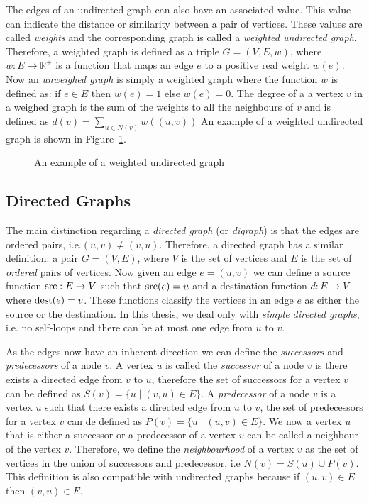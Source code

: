 The edges of an undirected graph can also have an associated value. This value can indicate the distance or similarity between a pair of vertices. These values are called \textit{weights} and the corresponding graph is called a \textit{weighted undirected graph}. Therefore, a weighted graph is defined as a triple $G=(V,E,w)$, where $w:E \rightarrow \mathbb{R}^{+}$ is a function that maps an edge $e$ to a positive real weight $w(e)$. Now an \textit{unweighed graph} is simply a weighted graph where the function $w$ is defined as: if $e \in E$ then $w(e)=1$ else $w(e)=0$. The degree of a a vertex $v$ in a weighed graph is the sum of the weights to all the neighbours of $v$ and is defined as $d(v) = \sum_{u\in N(v)}w((u,v))$ An example of a weighted undirected graph is shown in Figure~\ref{fig:weighted-undirected}. 
\begin{figure}[!ht]
    \centering
    
    \caption{An example of a weighted undirected graph}
    \label{fig:weighted-undirected}
\end{figure}


\subsection{Directed Graphs}
The main distinction regarding a \textit{directed graph} (or \textit{digraph}) is that the edges are ordered pairs, i.e.$(u,v) \neq (v,u)$. Therefore, a directed graph has a similar definition: a pair $G=(V,E)$, where $V$ is the set of vertices and $E$ is the set of \textit{ordered} pairs of vertices. Now given an edge $e=(u,v)$ we can define a source function $\operatorname*{src}:E\rightarrow V$ such that $\operatorname*{src}(e)=u$ and a destination function $d:E\rightarrow V$ where $\operatorname*{dest}(e)=v$. These functions classify the vertices in an edge $e$ as either the source or the destination. In this thesis, we deal only with \textit{simple directed graphs}, i.e. no self-loops and there can be at most one edge from $u$ to $v$. 

As the edges now have an inherent direction we can define the \textit{successors} and \textit{predecessors} of a node $v$. A vertex $u$ is called the \textit{successor} of a node $v$ is there exists a directed edge from $v$ to $u$, therefore the set of successors for a vertex $v$ can be defined as $S(v) = \{u \mid (v,u) \in E\}$. A \textit{predecessor} of a node $v$ is a vertex $u$ such that there exists a directed edge from $u$ to $v$, the set of predecessors for a vertex $v$ can de defined as $P(v) = \{u \mid (u,v) \in E\}$. We now a vertex $u$ that is either a successor or a predecessor of a vertex $v$ can be called a neighbour of the vertex $v$. Therefore, we define the \textit{neighbourhood} of a vertex $v$ as the set of vertices in the union of successors and predecessor, i.e $N(v) = S(u) \cup P(v)$. This definition is also compatible with undirected graphs because if $(u,v) \in E$ then $(v,u) \in E$. 

